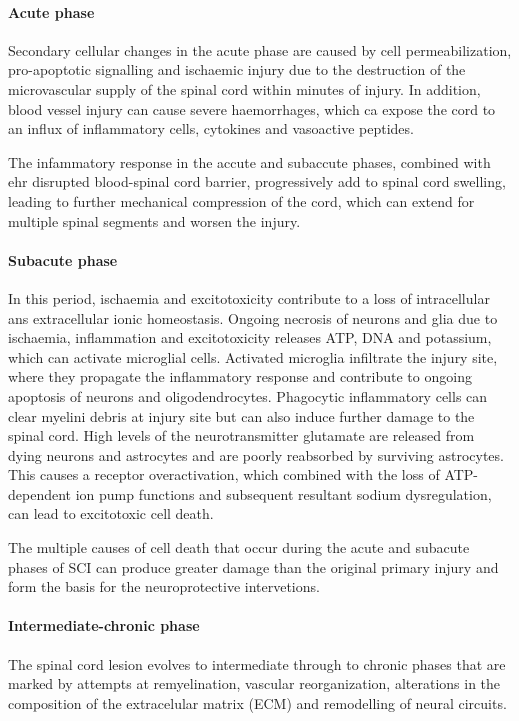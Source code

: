 \documentclass[12pt,article,oneside,a4paper]{memoir}
\begin{document}
\paragraph{Acute phase}
Secondary cellular changes in the acute phase are caused by cell permeabilization, pro-apoptotic signalling and ischaemic injury due to the destruction of the microvascular supply of the spinal cord within minutes of injury. In addition, blood vessel injury can cause severe haemorrhages, which ca expose the cord to an influx of inflammatory cells, cytokines and vasoactive peptides.

The infammatory response in the accute and subaccute phases, combined with ehr disrupted blood-spinal cord barrier, progressively add to spinal cord swelling, leading to further mechanical compression of the cord, which can extend for multiple spinal segments and worsen the injury.

\paragraph{Subacute phase}
In this period, ischaemia and excitotoxicity contribute to a loss of intracellular ans extracellular ionic homeostasis. Ongoing necrosis of neurons and glia due to ischaemia, inflammation and excitotoxicity releases ATP, DNA and potassium, which can activate microglial cells. Activated microglia infiltrate the injury site, where they propagate the inflammatory response and contribute to ongoing apoptosis of neurons and oligodendrocytes. Phagocytic inflammatory cells can clear myelini debris at injury site but can also induce further damage to the spinal cord. High levels of the neurotransmitter glutamate are released from dying neurons and astrocytes and are poorly reabsorbed by surviving astrocytes. This causes a receptor overactivation, which combined with the loss of ATP-dependent ion pump functions and subsequent resultant sodium dysregulation, can lead to excitotoxic cell death.

The multiple causes of cell death that occur during the acute and subacute phases of SCI can produce greater damage than the original primary injury and form the basis for the neuroprotective intervetions.

\paragraph{Intermediate-chronic phase}
The spinal cord lesion evolves to intermediate through to chronic phases that are marked by attempts at remyelination, vascular reorganization, alterations in the composition of the extracelular matrix (ECM) and remodelling of neural circuits.
\end{document}
